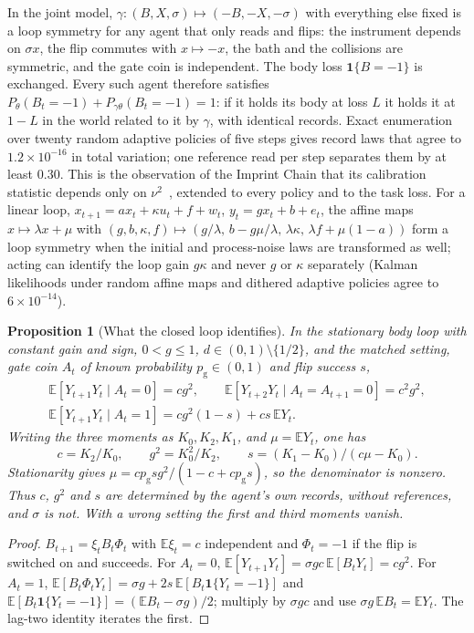 \documentclass[12pt]{article}
\newtheorem{proposition}[theorem]{Proposition}
\theoremstyle{definition}
\newcommand{\E}{\mathbb E}
\begin{document}
In the joint model, $\gamma:(B,X,\sigma)\mapsto(-B,-X,-\sigma)$ with everything else fixed is a loop symmetry for any agent that only reads and flips: the instrument depends on $\sigma x$, the flip commutes with $x\mapsto-x$, the bath and the collisions are symmetric, and the gate coin is independent. The body loss $\mathbf 1\{B=-1\}$ is exchanged. Every such agent therefore satisfies $P_\theta(B_t=-1)+P_{\gamma\theta}(B_t=-1)=1$: if it holds its body at loss $L$ it holds it at $1-L$ in the world related to it by $\gamma$, with identical records. Exact enumeration over twenty random adaptive policies of five steps gives record laws that agree to $1.2\times10^{-16}$ in total variation; one reference read per step separates them by at least $0.30$. This is the observation of the Imprint Chain that its calibration statistic depends only on $\nu^2$~\cite{Liu2026Chain}, extended to every policy and to the task loss. For a linear loop, $x_{t+1}=ax_t+\kappa u_t+f+w_t$, $y_t=gx_t+b+e_t$, the affine maps $x\mapsto\lambda x+\mu$ with $(g,b,\kappa,f)\mapsto(g/\lambda,\,b-g\mu/\lambda,\,\lambda\kappa,\,\lambda f+\mu(1-a))$ form a loop symmetry when the initial and process-noise laws are transformed as well; acting can identify the loop gain $g\kappa$ and never $g$ or $\kappa$ separately (Kalman likelihoods under random affine maps and dithered adaptive policies agree to $6\times10^{-14}$).

\begin{proposition}[What the closed loop identifies]
\label{prop:loopmoments}
In the stationary body loop with constant gain and sign, $0<g\le1$, $d\in(0,1)\setminus\{1/2\}$, and the matched setting, gate coin $A_t$ of known probability $p_{\mathrm g}\in(0,1)$ and flip success $s$,
\begin{gather*}
\E[Y_{t+1}Y_t\mid A_t=0]=cg^2,\qquad
\E[Y_{t+2}Y_t\mid A_t=A_{t+1}=0]=c^2g^2,\\
\E[Y_{t+1}Y_t\mid A_t=1]=cg^2(1-s)+cs\,\E Y_t .
\end{gather*}
Writing the three moments as $K_0,K_2,K_1$, and $\mu=\E Y_t$, one has
\[
c=K_2/K_0,\qquad g^2=K_0^2/K_2,\qquad s=(K_1-K_0)/(c\mu-K_0).
\]
Stationarity gives $\mu=cp_{\mathrm g}sg^2/(1-c+cp_{\mathrm g}s)$, so the denominator is nonzero. Thus $c$, $g^2$ and $s$ are determined by the agent's own records, without references, and $\sigma$ is not. With a wrong setting the first and third moments vanish.
\end{proposition}

\begin{proof}
$B_{t+1}=\xi_tB_t\Phi_t$ with $\E\xi_t=c$ independent and $\Phi_t=-1$ if the flip is switched on and succeeds. For $A_t=0$, $\E[Y_{t+1}Y_t]=\sigma gc\,\E[B_tY_t]=cg^2$. For $A_t=1$, $\E[B_t\Phi_tY_t]=\sigma g+2s\,\E[B_t\mathbf 1\{Y_t=-1\}]$ and $\E[B_t\mathbf 1\{Y_t=-1\}]=(\E B_t-\sigma g)/2$; multiply by $\sigma gc$ and use $\sigma g\,\E B_t=\E Y_t$. The lag-two identity iterates the first.
\end{proof}
\end{document}
